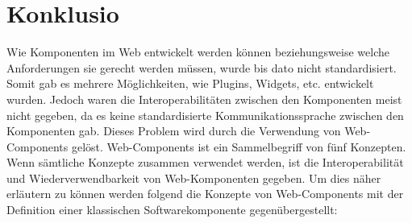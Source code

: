 \section{Konklusio}
\label{sec:7_Konklusion}

Wie Komponenten im Web entwickelt werden können beziehungsweise welche Anforderungen sie gerecht werden müssen, wurde bis dato nicht standardisiert. Somit gab es mehrere Möglichkeiten, wie Plugins, Widgets, etc. entwickelt wurden. Jedoch waren die Interoperabilitäten zwischen den Komponenten meist nicht gegeben, da es keine standardisierte Kommunikationssprache zwischen den Komponenten gab. Dieses Problem wird durch die Verwendung von Web-Components gelöst. Web-Components ist ein Sammelbegriff von fünf Konzepten. Wenn sämtliche Konzepte zusammen verwendet werden, ist die Interoperabilität und Wiederverwendbarkeit von Web-Komponenten gegeben. Um dies näher erläutern zu können werden folgend die Konzepte von Web-Components mit der Definition einer klassischen Softwarekomponente gegenübergestellt:

